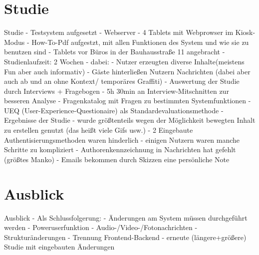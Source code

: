 \documentclass[11pt]{beamer}
\begin{document}
\section{Studie}
\begin{frame}{Studie}
  - Testsystem aufgesetzt
    - Webserver
    - 4 Tablets mit Webprowser im Kiosk-Modus
  - How-To-Pdf aufgestzt, mit allen Funktionen des System und wie sie zu benutzen sind
  - Tablets vor Büros in der Bauhausstraße 11 angebracht
  - Studienlaufzeit: 2 Wochen
    - dabei:
      - Nutzer erzeugten diverse Inhalte(meistens Fun aber auch informativ)
      - Gäste hinterließen Nutzern Nachrichten (dabei aber auch ab und an ohne Kontext/ temporäres Graffiti)
  - Auswertung der Studie durch Interviews + Fragebogen
    - 5h 30min an Interview-Mitschnitten zur besseren Analyse
    - Fragenkatalog mit Fragen zu bestimmten Systemfunktionen
    - UEQ (User-Experience-Questionaire) als Standardevaluationsmethode
  - Ergebnisse der Studie
    - wurde größtenteils wegen der Möglichkeit bewegten Inhalt zu erstellen genutzt (das heißt viele Gifs usw.)
    - 2 Eingebaute Authentisierungsmethoden waren hinderlich
    - einigen Nutzern waren manche Schritte zu kompliziert
    - Authorenkennzeichnung in Nachrichten hat gefehlt (größtes Manko)
    - Emails bekommen durch Skizzen eine persönliche Note
\end{frame}
\section{Ausblick}
\begin{frame}{Ausblick}
  - Als Schlussfolgerung:
    - Änderungen am System müssen durchgeführt werden
      - Poweruserfunktion
      - Audio-/Video-/Fotonachrichten
      - Strukturänderungen - Trennung Frontend-Backend
    - erneute (längere+größere) Studie mit eingebauten Änderungen
\end{frame}
\section*{}
\end{document}
